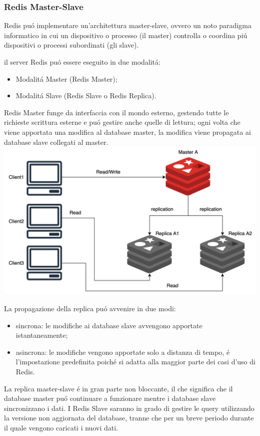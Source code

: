 \subsubsection{Redis Master-Slave}
Redis puó implementare un'architettura master-slave, ovvero un noto paradigma informatico in cui un dispositivo o processo (il master)
controlla o coordina piú dispositivi o processi subordinati (gli slave).

il server Redis puó essere eseguito in due modalitá:
\begin{itemize}
    \item Modalitá Master (Redis Master);
    \item Modalitá Slave (Redis Slave o Redis Replica).
\end{itemize}


Redis Master funge da interfaccia con il mondo esterno, gestendo tutte le richieste scrittura esterne e puó gestire anche
quelle di lettura;
ogni volta che viene apportata una modifica al database master, la modifica viene propagata ai database slave collegati al master.\\

\includegraphics[width=1\textwidth]{img/masterslaveRedis}

La propagazione della replica puó avvenire in due modi:
\begin{itemize}
    \item sincrona: le modifiche ai database slave avvengono apportate istantaneamente;
    \item asincrona: le modifiche vengono apportate solo a distanza di tempo, é l'impostazione predefinita poiché si adatta
    alla maggior parte dei casi d'uso di Redis.
\end{itemize}

La replica master-slave é in gran parte non bloccante, il che significa che il database master puó continuare a funzionare
mentre i database slave sincronizzano i dati.
I Redis Slave saranno in grado di gestire le query utilizzando la versione non aggiornata del database, tranne che per un breve
periodo durante il quale vengono caricati i nuovi dati.

